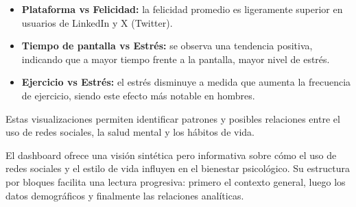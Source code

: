 \documentclass{../../../miPlantilla}
\begin{document}

\begin{itemize}
  \item \textbf{Plataforma vs Felicidad:} la felicidad promedio es ligeramente superior en usuarios de LinkedIn y X (Twitter).
  \item \textbf{Tiempo de pantalla vs Estrés:} se observa una tendencia positiva, indicando que a mayor tiempo frente a la pantalla, mayor nivel de estrés.
  \item \textbf{Ejercicio vs Estrés:} el estrés disminuye a medida que aumenta la frecuencia de ejercicio, siendo este efecto más notable en hombres.
\end{itemize}

Estas visualizaciones permiten identificar patrones y posibles relaciones entre el uso de redes sociales, la salud mental y los hábitos de vida.

El dashboard ofrece una visión sintética pero informativa sobre cómo el uso de redes sociales y el estilo de vida influyen en el bienestar psicológico. Su estructura por bloques facilita una lectura progresiva: primero el contexto general, luego los datos demográficos y finalmente las relaciones analíticas.
\end{document}
